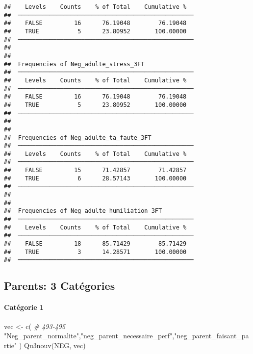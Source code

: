 \documentclass[
]{article}
\newenvironment{Shaded}{\begin{snugshade}}{\end{snugshade}}
\newcommand{\CommentTok}[1]{\textcolor[rgb]{0.56,0.35,0.01}{\textit{#1}}}
\newcommand{\FunctionTok}[1]{\textcolor[rgb]{0.00,0.00,0.00}{#1}}
\newcommand{\NormalTok}[1]{#1}
\newcommand{\OtherTok}[1]{\textcolor[rgb]{0.56,0.35,0.01}{#1}}
\newcommand{\StringTok}[1]{\textcolor[rgb]{0.31,0.60,0.02}{#1}}
\begin{document}
\begin{verbatim}
##    Levels    Counts    % of Total    Cumulative %   
##  ────────────────────────────────────────────────── 
##    FALSE         16      76.19048        76.19048   
##    TRUE           5      23.80952       100.00000   
##  ────────────────────────────────────────────────── 
## 
## 
##  Frequencies of Neg_adulte_stress_3FT               
##  ────────────────────────────────────────────────── 
##    Levels    Counts    % of Total    Cumulative %   
##  ────────────────────────────────────────────────── 
##    FALSE         16      76.19048        76.19048   
##    TRUE           5      23.80952       100.00000   
##  ────────────────────────────────────────────────── 
## 
## 
##  Frequencies of Neg_adulte_ta_faute_3FT             
##  ────────────────────────────────────────────────── 
##    Levels    Counts    % of Total    Cumulative %   
##  ────────────────────────────────────────────────── 
##    FALSE         15      71.42857        71.42857   
##    TRUE           6      28.57143       100.00000   
##  ────────────────────────────────────────────────── 
## 
## 
##  Frequencies of Neg_adulte_humiliation_3FT          
##  ────────────────────────────────────────────────── 
##    Levels    Counts    % of Total    Cumulative %   
##  ────────────────────────────────────────────────── 
##    FALSE         18      85.71429        85.71429   
##    TRUE           3      14.28571       100.00000   
##  ──────────────────────────────────────────────────
\end{verbatim}

\hypertarget{parents-3-catuxe9gories}{%
\subsection{Parents: 3 Catégories}\label{parents-3-catuxe9gories}}

\hypertarget{catuxe9gorie-1-6}{%
\paragraph{Catégorie 1}\label{catuxe9gorie-1-6}}

\begin{Shaded}
\begin{Highlighting}[]
\NormalTok{vec }\OtherTok{\textless{}{-}} \FunctionTok{c}\NormalTok{(  }\CommentTok{\# 493{-}495}
  \StringTok{"Neg\_parent\_normalite"}\NormalTok{,}\StringTok{"neg\_parent\_necessaire\_perf"}\NormalTok{,}\StringTok{"neg\_parent\_faisant\_partie"}  
\NormalTok{)}
\FunctionTok{Qu3nouv}\NormalTok{(NEG, vec)}
\end{Highlighting}
\end{Shaded}
\end{document}
